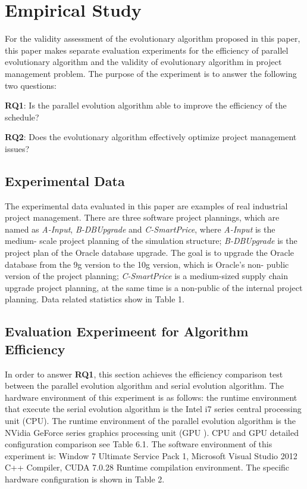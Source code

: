 \section{Empirical Study}
%
For the validity assessment of the evolutionary algorithm proposed in
this paper, this paper makes separate evaluation experiments for the
efficiency of parallel evolutionary algorithm and the validity of
evolutionary algorithm in project management problem. The purpose of
the experiment is to answer the following two questions:

\textbf{RQ1}: Is the parallel evolution algorithm able to improve the efficiency of 
the schedule?

\textbf{RQ2}: Does the evolutionary algorithm effectively optimize project management 
issues?

\subsection{Experimental Data}
%
The experimental data evaluated in this paper are examples of real
industrial project management. There are three software project
plannings, which are named as \emph{A-Input}, \emph{B-DBUpgrade} and
\emph{C-SmartPrice}, where \emph{A-Input} is the medium- scale project
planning of the simulation structure; \emph{B-DBUpgrade} is the
project plan of the Oracle database upgrade. The goal is to upgrade
the Oracle database from the 9g version to the 10g version, which is
Oracle's non- public version of the project planning;
\emph{C-SmartPrice} is a medium-sized supply chain upgrade project
planning, at the same time is a non-public of the internal project
planning\cite{ren}. Data related statistics show in Table 1.


\subsection{Evaluation Experimeent for Algorithm Efficiency}
%

In order to answer \textbf{RQ1}, this section achieves the efficiency
comparison test between the parallel evolution algorithm and serial
evolution algorithm. The hardware environment of this experiment is as
follows: the runtime environment that execute the serial evolution
algorithm is the Intel i7 series central processing unit (CPU). The
runtime environment of the parallel evolution algorithm is the NVidia
GeForce series graphics processing unit (GPU ). CPU and GPU detailed
configuration comparison see Table 6.1. The software environment of
this experiment is: Window 7 Ultimate Service Pack 1, Microsoft Visual
Studio 2012 C++ Compiler, CUDA 7.0.28 Runtime compilation
environment. The specific hardware configuration is shown in Table 2.

